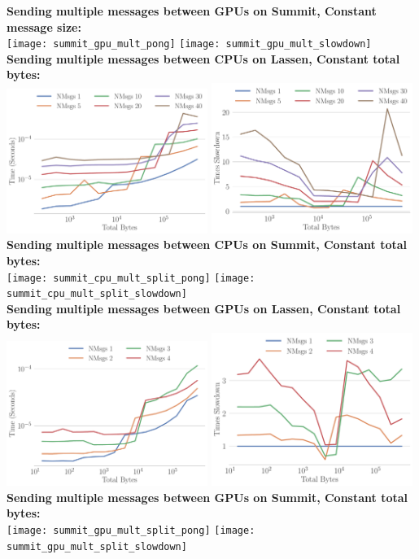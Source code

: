 \documentclass{article}
\begin{document}
\textbf{Sending multiple messages between GPUs on Summit, Constant message size:}\\
\texttt{[image: summit\_gpu\_mult\_pong]}
\texttt{[image: summit\_gpu\_mult\_slowdown]}\\


\textbf{Sending multiple messages between CPUs on Lassen, Constant total bytes:}\\
\includegraphics[width=0.49\textwidth]{lassen_cpu_mult_split_pong}
\includegraphics[width=0.49\textwidth]{lassen_cpu_mult_split_slowdown}\\

\textbf{Sending multiple messages between CPUs on Summit, Constant total bytes:}\\
\texttt{[image: summit\_cpu\_mult\_split\_pong]}
\texttt{[image: summit\_cpu\_mult\_split\_slowdown]}\\


\textbf{Sending multiple messages between GPUs on Lassen, Constant total bytes:}\\
\includegraphics[width=0.49\textwidth]{lassen_gpu_mult_split_pong}
\includegraphics[width=0.49\textwidth]{lassen_gpu_mult_split_slowdown}\\

\textbf{Sending multiple messages between GPUs on Summit, Constant total bytes:}\\
\texttt{[image: summit\_gpu\_mult\_split\_pong]}
\texttt{[image: summit\_gpu\_mult\_split\_slowdown]}\\
\end{document}
